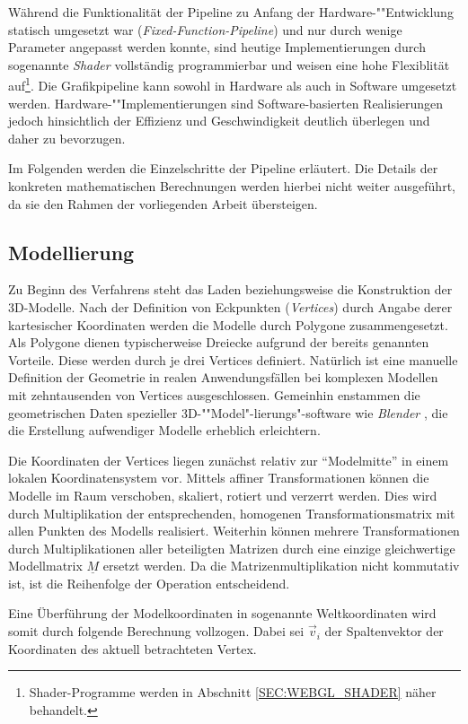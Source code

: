 Während die Funktionalität der Pipeline zu Anfang der Hardware-""Entwicklung statisch umgesetzt war (\emph{Fixed-Function-Pipeline}) und nur durch wenige Parameter angepasst werden konnte, sind heutige Implementierungen durch sogenannte \emph{Shader} vollständig programmierbar und weisen eine hohe Flexiblität auf\footnote{Shader-Programme werden in Abschnitt \ref{SEC:WEBGL_SHADER} näher behandelt.}. Die Grafikpipeline kann sowohl in Hardware als auch in Software umgesetzt werden. Hardware-""Implementierungen sind Software-basierten Realisierungen jedoch hinsichtlich der Effizienz und Geschwindigkeit deutlich überlegen und daher zu bevorzugen.

Im Folgenden werden die Einzelschritte der Pipeline erläutert. Die Details der konkreten mathematischen Berechnungen werden hierbei nicht weiter ausgeführt, da sie den Rahmen der vorliegenden Arbeit übersteigen.

\subsection{Modellierung}
Zu Beginn des Verfahrens steht das Laden beziehungsweise die Konstruktion der 3D-Modelle.
Nach der Definition von Eckpunkten (\emph{Vertices}) durch Angabe derer kartesischer Koordinaten werden die Modelle durch Polygone zusammengesetzt. Als Polygone dienen typischerweise Dreiecke aufgrund der bereits genannten Vorteile. Diese werden durch je drei Vertices definiert. Natürlich ist eine manuelle Definition der Geometrie in realen Anwendungsfällen bei komplexen Modellen mit zehntausenden von Vertices ausgeschlossen. Gemeinhin enstammen die geometrischen Daten spezieller 3D-""Model"-lierungs"-software wie \emph{Blender} \autocite{SOFTWARE_BLENDER}, die die Erstellung aufwendiger Modelle erheblich erleichtern.

Die Koordinaten der Vertices liegen zunächst relativ zur \enquote{Modelmitte} in einem lokalen Koordinatensystem vor. Mittels affiner Transformationen können die Modelle im Raum verschoben, skaliert, rotiert und verzerrt werden. Dies wird durch Multiplikation der entsprechenden, homogenen Transformationsmatrix mit allen Punkten des Modells realisiert. Weiterhin können mehrere Transformationen durch Multiplikationen aller beteiligten Matrizen durch eine einzige gleichwertige Modellmatrix $\underline{M}$ ersetzt werden. Da die Matrizenmultiplikation nicht kommutativ ist, ist die Reihenfolge der Operation entscheidend.

Eine Überführung der Modelkoordinaten in sogenannte Weltkoordinaten wird somit durch folgende Berechnung vollzogen. Dabei sei $\vec{v}_i$ der Spaltenvektor der Koordinaten des aktuell betrachteten Vertex.


